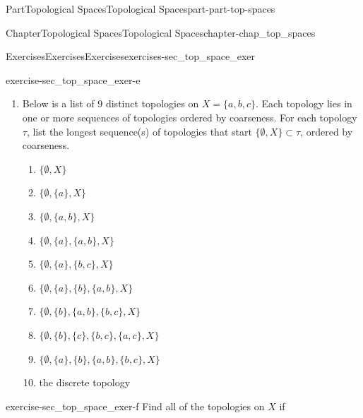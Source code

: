 \documentclass[oneside,10pt,]{book}
\numberwithin{equation}{chapter}
\newcommand{\B}{\mathcal{B}}
\begin{document}
\begin{partptx}{Part}{Topological Spaces}{}{Topological Spaces}{}{}{part-part-top-spaces}
\begin{chapterptx}{Chapter}{Topological Spaces}{}{Topological Spaces}{}{}{chapter-chap_top_spaces}
\begin{exercises-section}{Exercises}{Exercises}{}{Exercises}{}{}{exercises-sec_top_space_exer}
\begin{divisionexercise}{5}{}{}{exercise-sec_top_space_exer-e}
\begin{enumerate}[font=\bfseries,label=(\alph*),ref=\alph*]
\begin{enumerate}[font=\bfseries,label=(\roman*),ref=\theenumi.\roman*]
\item{}If \(x \in X\), let \(U_x\) be the intersection of all open sets that contain \(x\). Explain why \(U_x\) is an open set.%
\item{}Let \(\B_{\text{min}} = \{U_x \mid x \in X\}\). Show that \(\B_{\text{min}}\) is a basis for \(\tau\).%
\item{}Show that if \(\B\) is a basis for \(\tau\), then \(\B_{\text{min}} \subseteq \B\).%
\item{}Let \(X = \{a,b,c,d\}\) and let%
\begin{equation*}
\tau = \{\emptyset, \{a\}, \{a, b\}, \{a, c\}, \{a, b, c\}, \{a, d\}, \{a, b, d\}, \{a, c, d\}, \{a, b, c, d\}\}\text{.}
\end{equation*}
You may assume that \(\tau\) is a topology on \(X\). Find the unique minimal basis for \(\tau\).%
\end{enumerate}%
\item{}Below is a list of \(9\) distinct topologies on \(X = \{a,b,c\}\). Each topology lies in one or more sequences of topologies ordered by coarseness. For each topology \(\tau\), list the longest sequence(s) of topologies that start \(\{\emptyset, X\} \subset \tau\), ordered by coarseness.%
\begin{enumerate}[label=\arabic*]
\item{}\(\displaystyle \{\emptyset, X\}\)%
\item{}\(\displaystyle \{\emptyset, \{a\}, X\}\)%
\item{}\(\displaystyle \{\emptyset, \{a,b\}, X\}\)%
\item{}\(\displaystyle \{\emptyset, \{a\}, \{a,b\}, X\}\)%
\item{}\(\displaystyle \{\emptyset, \{a\}, \{b,c\}, X\}\)%
\item{}\(\displaystyle \{\emptyset, \{a\}, \{b\}, \{a,b\}, X\}\)%
\item{}\(\displaystyle \{\emptyset, \{b\}, \{a,b\}, \{b,c\}, X\}\)%
\item{}\(\displaystyle \{\emptyset, \{b\}, \{c\}, \{b,c\}, \{a,c\}, X\}\)%
\item{}\(\displaystyle \{\emptyset, \{a\}, \{b\}, \{a,b\}, \{b,c\}, X\}\)%
\item{}the discrete topology%
\end{enumerate}
%
\end{enumerate}%
\end{divisionexercise}%
\begin{divisionexercise}{6}{}{}{exercise-sec_top_space_exer-f}%
Find all of the topologies on \(X\) if%

\end{divisionexercise}
\end{exercises-section}
\end{chapterptx}
\end{partptx}
\end{document}
